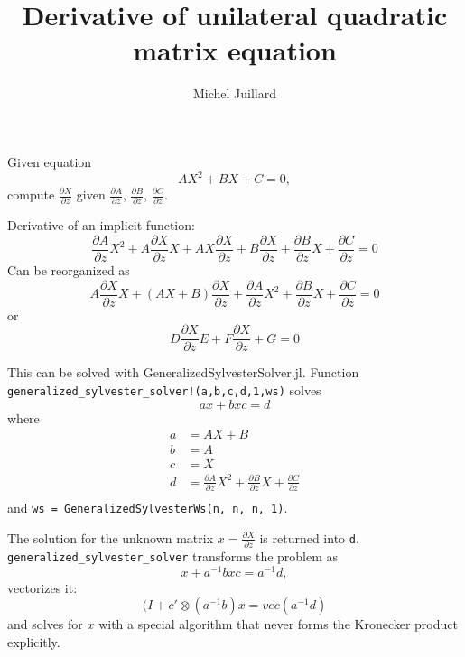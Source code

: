 \documentclass{article}
\title{Derivative of unilateral quadratic matrix equation}
\author{Michel Juillard}
\begin{document}
\maketitle

Given equation
\[
  AX^2 + BX + C = 0,
\]
compute $\frac{\partial X}{\partial z}$ given $\frac{\partial
  A}{\partial z}$, $\frac{\partial B}{\partial z}$, $\frac{\partial
  C}{\partial z}$.

Derivative of an implicit function:
\[
  \frac{\partial A}{\partial z}X^2 + A\frac{\partial X}{\partial z}X
  + AX\frac{\partial X}{\partial z} + B\frac{\partial X}{\partial z}
  + \frac{\partial B}{\partial z}X + \frac{\partial C}{\partial z} = 0
\]
Can be reorganized as
\[
  A\frac{\partial X}{\partial z}X
  + (AX + B)\frac{\partial X}{\partial z} +\frac{\partial A}{\partial z}X^2 
  + \frac{\partial B}{\partial z}X + \frac{\partial C}{\partial z} = 0
\]
or
\[
  D\frac{\partial X}{\partial z}E
  + F\frac{\partial X}{\partial z} + G =0
\]

This can be solved with GeneralizedSylvesterSolver.jl. Function\\
\verb+generalized_sylvester_solver!(a,b,c,d,1,ws)+ solves
\[
  ax + bxc = d
\]
where
\begin{align*}
  a &= AX + B\\
  b &= A\\
  c &= X\\
  d &= \frac{\partial A}{\partial z}X^2 
      + \frac{\partial B}{\partial z}X + \frac{\partial C}{\partial z}\\
\end{align*}
and \verb+ws = GeneralizedSylvesterWs(n, n, n, 1)+.

The solution for the unknown matrix $x=\frac{\partial X}{\partial z}$
is returned into \verb+d+.\\ 
\verb+generalized_sylvester_solver+ transforms the problem as
\[
  x + a^{-1}bxc = a^{-1}d,
\]  
vectorizes it:
\[
  (I + c'\otimes(a^{-1}b)x = vec(a^{-1}d)
\]
and solves for $x$ with a special algorithm that never forms the Kronecker
product explicitly.
\end{document}
